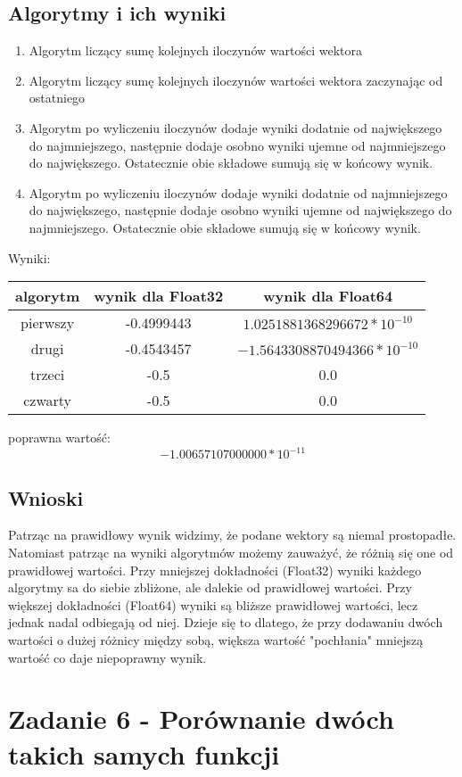 \documentclass[12pt, a4paper]{article}
\begin{document}
\subsection{Algorytmy i ich wyniki}
\begin{enumerate}
  \item Algorytm liczący sumę kolejnych iloczynów wartości wektora
  \item Algorytm liczący sumę kolejnych iloczynów wartości wektora zaczynając od ostatniego
  \item Algorytm po wyliczeniu iloczynów dodaje wyniki dodatnie od największego do najmniejszego, następnie dodaje osobno wyniki ujemne od najmniejszego do największego. Ostatecznie obie składowe sumują się w końcowy wynik.
  \item Algorytm po wyliczeniu iloczynów dodaje wyniki dodatnie od najmniejszego do największego, następnie dodaje osobno wyniki ujemne od największego do najmniejszego. Ostatecznie obie składowe sumują się w końcowy wynik.
\end{enumerate}
Wyniki:
\begin{center}
  \begin{tabular}{c|c|c}
    algorytm & wynik dla Float32 & wynik dla Float64\\
    \hline
    pierwszy & -0.4999443 & $1.0251881368296672 * 10^{-10}$\\
    drugi & -0.4543457 & $-1.5643308870494366 * 10^{-10}$\\
    trzeci & -0.5 & 0.0\\
    czwarty & -0.5 & 0.0
  \end{tabular}
\end{center}
poprawna wartość: \[-1.00657107000000 * 10^{-11}\]
\subsection{Wnioski}
Patrząc na prawidłowy wynik widzimy, że podane wektory są niemal prostopadłe. Natomiast patrząc na wyniki algorytmów możemy zauważyć, że różnią się one od prawidłowej wartości. Przy mniejszej dokładności (Float32) wyniki każdego algorytmy sa do siebie zbliżone, ale dalekie od prawidłowej wartości. Przy większej dokładności (Float64) wyniki są bliższe prawidłowej wartości, lecz jednak nadal odbiegają od niej. Dzieje się to dlatego, że przy dodawaniu dwóch wartości o dużej różnicy między sobą, większa wartość "pochłania" mniejszą wartość co daje niepoprawny wynik.


\section{Zadanie 6 - Porównanie dwóch takich samych funkcji}
\end{document}

